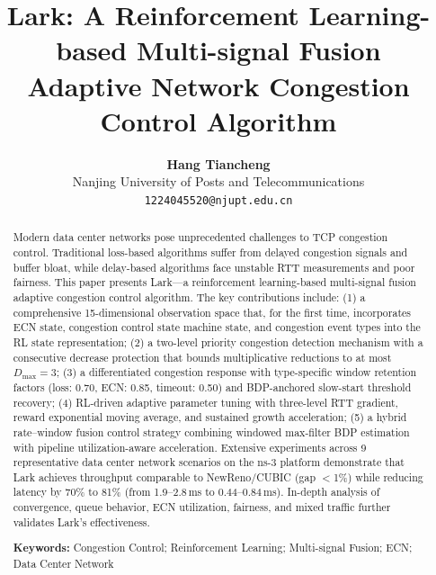 \documentclass[10pt,twocolumn]{article}
\begin{document}
\title{\Large\textbf{Lark: A Reinforcement Learning-based Multi-signal Fusion\\Adaptive Network Congestion Control Algorithm}}

\author{
    \textbf{Hang Tiancheng} \\
    Nanjing University of Posts and Telecommunications \\
    \texttt{1224045520@njupt.edu.cn}
}

\date{}
\maketitle

\begin{abstract}
Modern data center networks pose unprecedented challenges to TCP congestion control. Traditional loss-based algorithms suffer from delayed congestion signals and buffer bloat, while delay-based algorithms face unstable RTT measurements and poor fairness. This paper presents Lark---a reinforcement learning-based multi-signal fusion adaptive congestion control algorithm. The key contributions include: (1) a comprehensive 15-dimensional observation space that, for the first time, incorporates ECN state, congestion control state machine state, and congestion event types into the RL state representation; (2) a two-level priority congestion detection mechanism with a consecutive decrease protection that bounds multiplicative reductions to at most $D_{\max}=3$; (3) a differentiated congestion response with type-specific window retention factors (loss: 0.70, ECN: 0.85, timeout: 0.50) and BDP-anchored slow-start threshold recovery; (4) RL-driven adaptive parameter tuning with three-level RTT gradient, reward exponential moving average, and sustained growth acceleration; (5) a hybrid rate--window fusion control strategy combining windowed max-filter BDP estimation with pipeline utilization-aware acceleration. Extensive experiments across 9 representative data center network scenarios on the ns-3 platform demonstrate that Lark achieves throughput comparable to NewReno/CUBIC (gap $<$1\%) while reducing latency by 70\% to 81\% (from 1.9--2.8\,ms to 0.44--0.84\,ms). In-depth analysis of convergence, queue behavior, ECN utilization, fairness, and mixed traffic further validates Lark's effectiveness.

\vspace{0.3em}
\noindent\textbf{Keywords:} Congestion Control; Reinforcement Learning; Multi-signal Fusion; ECN; Data Center Network
\end{abstract}
\end{document}
